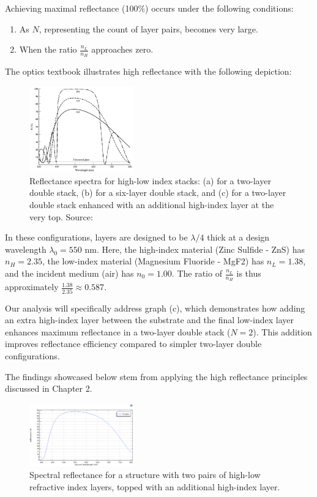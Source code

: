 Achieving maximal reflectance (100\%) occurs under the following conditions:
\begin{enumerate}
    \item As $N$, representing the count of layer pairs, becomes very large.
    \item When the ratio $\frac{n_L}{n_H}$ approaches zero.
\end{enumerate}

The optics textbook illustrates high reflectance with the following depiction:

\begin{figure}[ht!]
\centering
\includegraphics[width=0.4\textwidth]{Chapters/Figures/Chapter 4 Figures/High-Reflectance Graphs in the Optics Book.png}
\caption{Reflectance spectra for high-low index stacks: (a) for a two-layer double stack, (b) for a six-layer double stack, and (c) for a two-layer double stack enhanced with an additional high-index layer at the very top. Source: \cite{pedrotti_introduction_2007}}
\label{fig:Reflectance spectra from optical literature}
\end{figure}

In these configurations, layers are designed to be $\lambda/4$ thick at a design wavelength $\lambda_0 = 550$ nm. Here, the high-index material (Zinc Sulfide - ZnS) has $n_H = 2.35$, the low-index material (Magnesium Fluoride - MgF2) has $n_L = 1.38$, and the incident medium (air) has $n_0 = 1.00$. The ratio of $\frac{n_L}{n_H}$ is thus approximately $\frac{1.38}{2.35} \approx 0.587$.

Our analysis will specifically address graph (c), which demonstrates how adding an extra high-index layer between the substrate and the final low-index layer enhances maximum reflectance in a two-layer double stack ($N = 2$). This addition improves reflectance efficiency compared to simpler two-layer double configurations.

The findings showcased below stem from applying the high reflectance principles discussed in Chapter 2.

\begin{figure}[ht!]
  \centering
  \includegraphics[width=0.4\textwidth]{Chapters/Figures/Chapter 4 Figures/High-Reflectance (5 Layers).png}
  \caption{Spectral reflectance for a structure with two pairs of high-low refractive index layers, topped with an additional high-index layer.}
  \label{fig:Reflectance 5-layer structure}
\end{figure}


